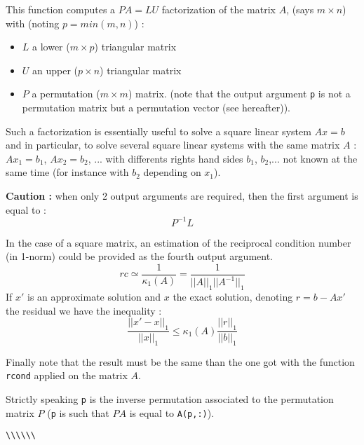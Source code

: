 \begin{mandescription}
This function computes a $P A = L U$ factorization of the matrix $A$, 
(says $m \times n$) with (noting $p = min(m,n)$) :
\begin{itemize}
\item $L$ a lower  ($m \times p$) triangular matrix
\item $U$ an upper  ($p \times n$) triangular matrix
\item $P$ a permutation  ($m \times m$) matrix.
      (note that the output argument \verb+p+ is not a permutation matrix
       but a permutation vector (see hereafter)). 
\end{itemize}
Such a factorization is essentially useful to solve a square linear
system $A x = b$ and in particular, to solve several square linear
systems with the same matrix $A$ : $Ax_1=b_1$, $Ax_2 = b_2$, ... with
differents rights hand sides $b_1$, $b_2$,... not known at the same
time (for instance with $b_2$ depending on $x_1$). 

{\bf Caution :} when only 2 output arguments are required, then the first argument is
equal to :
$$
P^{-1}L
$$



In the case of a square matrix, an estimation of the reciprocal
condition number (in 1-norm) could be provided as the fourth output argument.
$$
rc \simeq \frac{1}{\kappa_1(A)} = \frac{1}{||A||_1 ||A^{-1}||_1}
$$
If $x'$ is an approximate solution and $x$ the exact solution,
denoting $r = b - Ax'$ the residual we have the inequality :
$$
\frac{||x' - x||_1}{||x||_1} \le \kappa_1(A) \frac{||r||_1}{||b||_1}
$$
 
Finally note that the result must be the same than the one got 
with the function \verb+rcond+ applied on the matrix $A$.
 
Strictly speaking \verb+p+ is the inverse permutation associated
to the permutation matrix $P$ (\verb+p+ is such that $PA$ is equal 
to \verb+A(p,:)+).

\end{mandescription}

\begin{examples}
  \begin{program}\verb+\+\verb+\+\verb+\+\verb+\+\verb+\+\verb+\+
  \end{program}
\end{examples}

